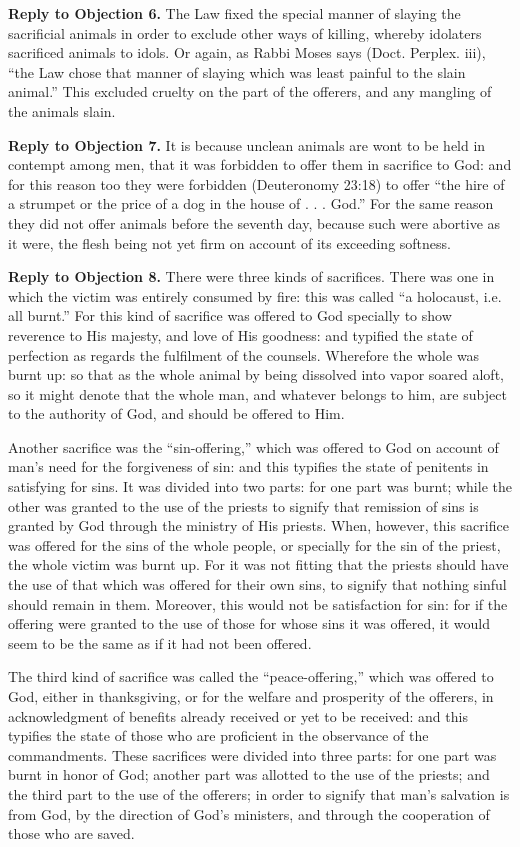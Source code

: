 \textbf{Reply to Objection 6.} The Law fixed the special manner of slaying the sacrificial animals in order to exclude other ways of killing, whereby idolaters sacrificed animals to idols. Or again, as Rabbi Moses says (Doct. Perplex. iii), ``the Law chose that manner of slaying which was least painful to the slain animal.'' This excluded cruelty on the part of the offerers, and any mangling of the animals slain.

\textbf{Reply to Objection 7.} It is because unclean animals are wont to be held in contempt among men, that it was forbidden to offer them in sacrifice to God: and for this reason too they were forbidden (Deuteronomy 23:18) to offer ``the hire of a strumpet or the price of a dog in the house of . . . God.'' For the same reason they did not offer animals before the seventh day, because such were abortive as it were, the flesh being not yet firm on account of its exceeding softness.

\textbf{Reply to Objection 8.} There were three kinds of sacrifices. There was one in which the victim was entirely consumed by fire: this was called ``a holocaust, i.e. all burnt.'' For this kind of sacrifice was offered to God specially to show reverence to His majesty, and love of His goodness: and typified the state of perfection as regards the fulfilment of the counsels. Wherefore the whole was burnt up: so that as the whole animal by being dissolved into vapor soared aloft, so it might denote that the whole man, and whatever belongs to him, are subject to the authority of God, and should be offered to Him.

Another sacrifice was the ``sin-offering,'' which was offered to God on account of man's need for the forgiveness of sin: and this typifies the state of penitents in satisfying for sins. It was divided into two parts: for one part was burnt; while the other was granted to the use of the priests to signify that remission of sins is granted by God through the ministry of His priests. When, however, this sacrifice was offered for the sins of the whole people, or specially for the sin of the priest, the whole victim was burnt up. For it was not fitting that the priests should have the use of that which was offered for their own sins, to signify that nothing sinful should remain in them. Moreover, this would not be satisfaction for sin: for if the offering were granted to the use of those for whose sins it was offered, it would seem to be the same as if it had not been offered.

The third kind of sacrifice was called the ``peace-offering,'' which was offered to God, either in thanksgiving, or for the welfare and prosperity of the offerers, in acknowledgment of benefits already received or yet to be received: and this typifies the state of those who are proficient in the observance of the commandments. These sacrifices were divided into three parts: for one part was burnt in honor of God; another part was allotted to the use of the priests; and the third part to the use of the offerers; in order to signify that man's salvation is from God, by the direction of God's ministers, and through the cooperation of those who are saved.

